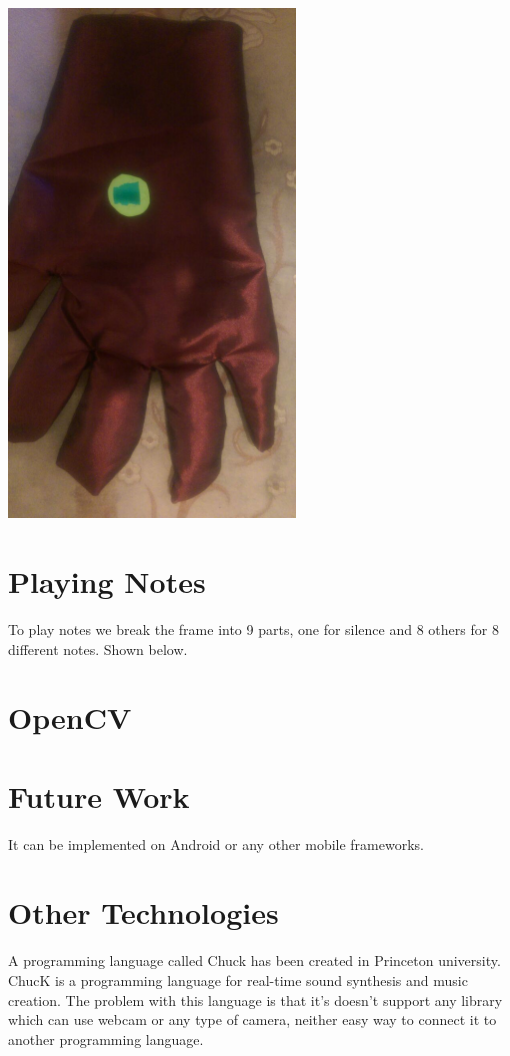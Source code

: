 \documentclass{report}
\begin{document}
\begin{center}
	\includegraphics[width=3in]{Object8.jpg}
\end{center}

\section{Playing Notes}
To play notes we break the frame into 9 parts, one for silence and 8 others for 8 different notes. Shown below.

\section{OpenCV}

\section{Future Work}
It can be implemented on Android or any other mobile frameworks.
\section{Other Technologies}
A programming language called Chuck has been created in Princeton university. ChucK is a programming language for real-time sound synthesis and music creation. The problem with this language is that it's doesn't support any library which can use webcam or any type of camera, neither easy way to connect it to another programming language.


\end{document}
